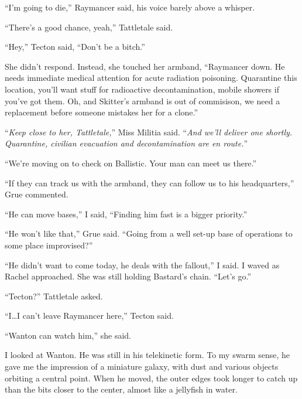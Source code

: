 ``I'm going to die,'' Raymancer said, his voice barely above a whisper.



``There's a good chance, yeah,'' Tattletale said.



``Hey,'' Tecton said, ``Don't be a bitch.''



She didn't respond.  Instead, she touched her armband, ``Raymancer down.  He needs immediate medical attention for acute radiation poisoning.  Quarantine this location, you'll want stuff for radioactive decontamination, mobile showers if you've got them.  Oh, and Skitter's armband is out of commisison, we need a replacement before someone mistakes her for a clone.''



``\emph{Keep close to her, Tattletale,}''  Miss Militia said.  ``\emph{And we'll deliver one shortly.  Quarantine, civilian evacuation and decontamination are en route.}''



``We're moving on to check on Ballistic.  Your man can meet us there.''



``If they can track us with the armband, they can follow us to his headquarters,'' Grue commented.



``He can move bases,'' I said, ``Finding him fast is a bigger priority.''



``He won't like that,'' Grue said.  ``Going from a well set-up base of operations to some place improvised?''



``He didn't want to come today, he deals with the fallout,'' I said.  I waved as Rachel approached.  She was still holding Bastard's chain.  ``Let's go.''



``Tecton?'' Tattletale asked.



``I\ldots I can't leave Raymancer here,'' Tecton said.



``Wanton can watch him,'' she said.



I looked at Wanton.  He was still in his telekinetic form.  To my swarm sense, he gave me the impression of a miniature galaxy, with dust and various objects orbiting a central point.  When he moved, the outer edges took longer to catch up than the bits closer to the center, almost like a jellyfish in water.



